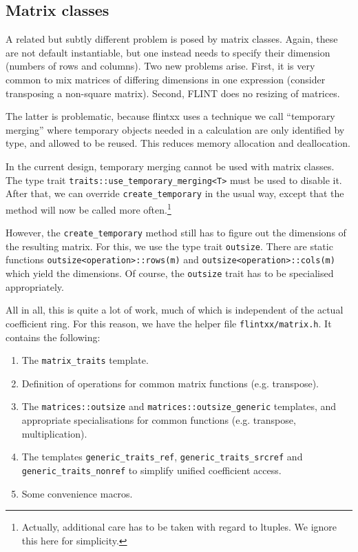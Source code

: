 \documentclass[a4paper,10pt]{book}
\newcommand{\code}{\lstinline}
\begin{document}
{{\subsection{Matrix classes}

A related but subtly different problem is posed by matrix classes. Again, these
are not default instantiable, but one instead needs to specify their dimension
(numbers of rows and columns). Two new problems arise. First, it is very common
to mix matrices of differing dimensions in one expression (consider transposing
a non-square matrix). Second, FLINT does no resizing of matrices.

The latter is problematic, because flintxx uses a technique we call ``temporary
merging'' where temporary objects needed in a calculation are only identified by
type, and allowed to be reused. This reduces memory allocation and deallocation.

In the current design, temporary merging cannot be used with matrix classes. The
type trait \code{traits::use_temporary_merging<T>} must be used to disable it.
After that, we can override \code{create_temporary} in the usual way, except
that the method will now be called more often.\footnote{Actually, additional care
has to be taken with regard to ltuples. We ignore this here for simplicity.}

However, the \code{create_temporary} method still has to figure out the
dimensions of the resulting matrix. For this, we use the type trait
\code{outsize}. There are static functions \code{outsize<operation>::rows(m)}
and \code{outsize<operation>::cols(m)} which yield the dimensions. Of course,
the \code{outsize} trait has to be specialised appropriately.

All in all, this is quite a lot of work, much of which is independent of the
actual coefficient ring. For this reason, we have the helper file
\code{flintxx/matrix.h}. It contains the following:
\begin{enumerate}
  \item The \code{matrix_traits} template.
  \item Definition of operations for common matrix functions (e.g. transpose).
  \item The \code{matrices::outsize} and \code{matrices::outsize_generic}
        templates, and appropriate specialisations for common functions
        (e.g. transpose, multiplication).
  \item The templates \code{generic_traits_ref}, \code{generic_traits_srcref}
        and \code{generic_traits_nonref} to simplify unified coefficient access.
  \item Some convenience macros.
\end{enumerate}

}}
\end{document}
